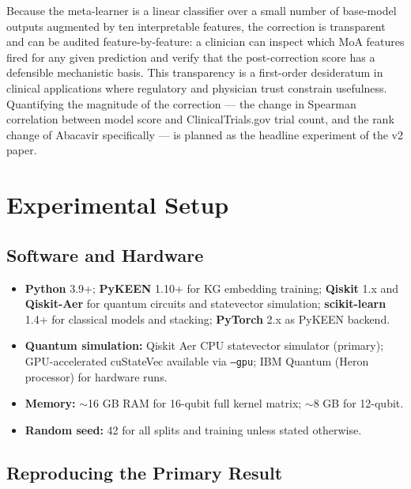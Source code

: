 \documentclass[twocolumn,10pt]{article}
\begin{document}
Because the meta-learner is a linear classifier over a small number of base-model outputs augmented by ten interpretable features, the correction is transparent and can be audited feature-by-feature: a clinician can inspect which MoA features fired for any given prediction and verify that the post-correction score has a defensible mechanistic basis. This transparency is a first-order desideratum in clinical applications where regulatory and physician trust constrain usefulness. Quantifying the magnitude of the correction --- the change in Spearman correlation between model score and ClinicalTrials.gov trial count, and the rank change of Abacavir specifically --- is planned as the headline experiment of the v2 paper.

\section{Experimental Setup}

\subsection{Software and Hardware}

\begin{itemize}[leftmargin=*]
\item \textbf{Python} 3.9+; \textbf{PyKEEN} 1.10+ for KG embedding training; \textbf{Qiskit} 1.x and \textbf{Qiskit-Aer} for quantum circuits and statevector simulation; \textbf{scikit-learn} 1.4+ for classical models and stacking; \textbf{PyTorch} 2.x as PyKEEN backend.
\item \textbf{Quantum simulation:} Qiskit Aer CPU statevector simulator (primary); GPU-accelerated cuStateVec available via \texttt{--gpu}; IBM Quantum (Heron processor) for hardware runs.
\item \textbf{Memory:} ${\sim}$16 GB RAM for 16-qubit full kernel matrix; ${\sim}$8 GB for 12-qubit.
\item \textbf{Random seed:} 42 for all splits and training unless stated otherwise.
\end{itemize}

\subsection{Reproducing the Primary Result}\label{sec:exp_repro}
\end{document}
